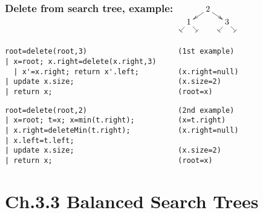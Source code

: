 \documentclass[handout]{beamer}
\begin{document}
\begin{frame}[fragile]
    \frametitle{Delete from search tree, example:
$\xymatrix@R=.1cm@C=.1cm{&&&2\ar@{->}[dll]\ar@{->}[rrd]&&\\
&1\ar@{-|}[dl]\ar@{-|}[dr]&&&&3\ar@{-|}[dl]\ar@{-|}[dr]&\\&&&&&&}$              }
\begin{verbatim}
root=delete(root,3)                     (1st example)
| x=root; x.right=delete(x.right,3) 
  | x'=x.right; return x'.left;         (x.right=null)
| update x.size;                        (x.size=2)
| return x;                             (root=x)
\end{verbatim}

\begin{verbatim}
root=delete(root,2)                     (2nd example)
| x=root; t=x; x=min(t.right);          (x=t.right)
| x.right=deleteMin(t.right);           (x.right=null)
| x.left=t.left;
| update x.size;                        (x.size=2)
| return x;                             (root=x)
\end{verbatim}

\end{frame}

\section{Ch.3.3 Balanced Search Trees}
\end{document}
